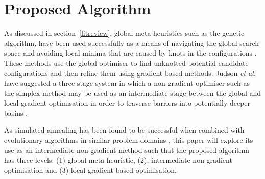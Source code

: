 \documentclass{article}
\begin{document}
\section{Proposed Algorithm} \label{proposed}

As discussed in section~\ref{litreview}, global meta-heuristics such as the
genetic algorithm, have been used successfully as a means of navigating the
global search space and avoiding local minima that are caused by knots in the
configurations \cite{PULLAN1998331, doi:10.1002/qua.560440214}. These methods
use the global optimiser to find unknotted potential candidate configurations
and then refine them using gradient-based methods. Judson \textit{et al.} have
suggested a three stage system in which a non-gradient optimiser such as the
simplex method may be used as an intermediate stage between the global and
local-gradient optimisation in order to traverse barriers into potentially
deeper basins \cite{doi:10.1002/qua.560440214}.

As simulated annealing has been found to be successful when combined with
evolutionary algorithms in similar problem domains \cite{PhysRevLett.91.080201},
this paper will explore its use as an intermediate non-gradient method such that
the proposed algorithm has three levels: (1) global meta-heuristic, (2),
intermediate non-gradient optimisation and (3) local gradient-based
optimisation.



\pagebreak

\printbibliography
\end{document}
